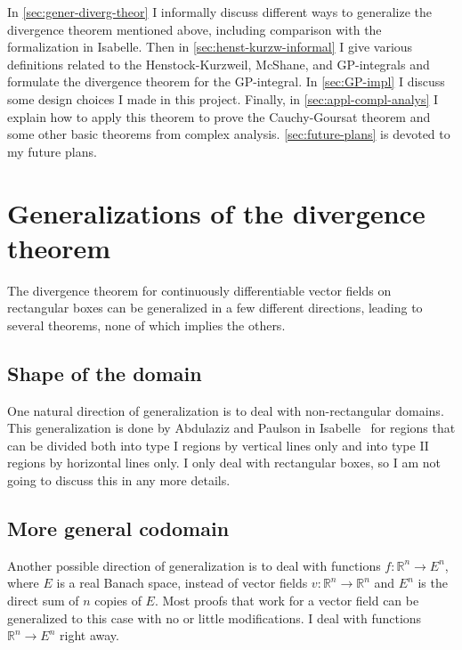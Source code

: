 \documentclass[a4paper, UKenglish,cleveref, autoref, thm-restate]{lipics-v2021}
\newcommand{\bbR}{\mathbb{R}}
\begin{document}
In \autoref{sec:gener-diverg-theor} I informally discuss different
ways to generalize the divergence theorem mentioned above, including
comparison with the formalization in Isabelle. Then in
\autoref{sec:henst-kurzw-informal} I give various definitions related
to the Henstock-Kurzweil, McShane, and GP-integrals and formulate the
divergence theorem for the GP-integral. In \autoref{sec:GP-impl} I
discuss some design choices I made in this project. Finally, in
\autoref{sec:appl-compl-analys} I explain how to apply this theorem to
prove the Cauchy-Goursat theorem and some other basic theorems from
complex analysis. \autoref{sec:future-plans} is devoted to my future
plans.

\section{Generalizations of the divergence theorem}%
\label{sec:gener-diverg-theor}

The divergence theorem for continuously differentiable vector fields
on rectangular boxes can be generalized in a few different directions,
leading to several theorems, none of which implies the others.

\subsection{Shape of the domain}
One natural direction of generalization is to deal with
non-rectangular domains. This generalization is done by Abdulaziz and
Paulson in Isabelle~\cite{Abdulaziz_Paulson} for regions that can be
divided both into type I regions by vertical lines only and into type
II regions by horizontal lines only. I only deal with rectangular
boxes, so I am not going to discuss this in any more details.


\subsection{More general codomain}
Another possible direction of generalization is to deal with functions
\(f\colon \bbR^{n}\to E^{n}\), where \(E\) is a real Banach space,
instead of vector fields \(v\colon \bbR^{n}\to\bbR^{n}\) and \(E^{n}\)
is the direct sum of \(n\) copies of \(E\). Most proofs that work for
a vector field can be generalized to this case with no or little
modifications. I deal with functions \(\bbR^{n}\to E^{n}\) right away.
\end{document}
